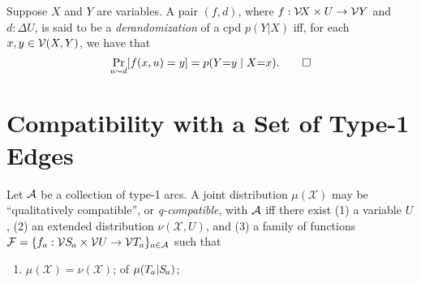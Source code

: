\documentclass{article}
\newcommand{\X}{\mathcal X}
\begin{document}
\begin{defn}
    Suppose $X$ and $Y$ are variables.
    A pair $(f, d)$, where $f : \mathcal V\!X \times U \to \mathcal V Y$ and $d : \Delta U$,
    is said to be a \emph{derandomization} of a cpd $p(Y|X)$ iff, for each $x, y \in \mathcal V(X,Y)$, we have that 
    \[
        \Pr_{u\sim d} [ f(x, u) = y] = p(Y{=}y\mid X{=}x).
        \qedhere
    \]
\end{defn}

\section{Compatibility with a Set of Type-1 Edges}
\begin{defn}
    Let $\mathcal A 
    $ be a collection of type-1 arcs. 
    A joint distribution $\mu(\X)$ may be ``qualitatively compatible'', or
    \emph{q-compatible}, with $\mathcal A$  iff
% 
    there exist (1) a variable $U$, 
    (2) an extended distribution $\nu(\X, U)$,
    and (3) a family of 
    functions
    $\mathcal F = 
    \{ f_a : \V\Src a \times \V U \to  \V\Tgt a\}_{a\in \Ar} $ such that
    \begin{enumerate}[label=(\alph*)]
        \item $\mu(\X) = \nu(\X)$;
        of $\mu(\Tgt a | \Src a)$;
        

\end{enumerate}
\end{defn}
\end{document}
